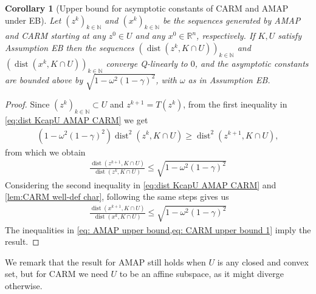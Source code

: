 \documentclass[smallextended,numbook,nospthms]{svjour3}
\theoremstyle{plain}
\newtheorem{corollary}[theorem]{Corollary}
\theoremstyle{definition}
\def\RR{\mathds R}
\def\NN{\mathds N}
\DeclareMathOperator{\dist}{dist}
\begin{document}
\begin{corollary}[Upper bound for asymptotic constants of CARM and AMAP under EB]\label{prop:EB Q conv}
	Let $\left(z^{k}\right)_{k \in \NN}$ and $\left(x^{k}\right)_{k \in \NN}$ be the sequences generated by AMAP and CARM starting at any $z^{0} \in U$ and any $x^{0} \in \RR^{n}$, respectively. If $K, U$ satisfy Assumption EB then the sequences $\left(\dist\left(z^{k}, K \cap U\right)\right)_{k \in \NN}$ and $\left(\dist\left(x^{k}, K \cap U\right)\right)_{k \in \NN}$ converge Q-linearly to $0$, and the asymptotic constants are bounded above by $\sqrt{1-\omega^{2}(1-\gamma)^{2}}$, with $\omega$ as in Assumption EB.
\end{corollary}
\begin{proof}
    Since $\left(z^{k}\right)_{k \in \NN} \subset U$ and $z^{k+1}=T\left(z^{k}\right)$, from the first inequality in \cref{eq:dist KcapU AMAP CARM} we get
	\begin{align}
		\left(1-\omega^{2}(1-\gamma)^{2}\right) \dist^{2}\left(z^{k}, K \cap U\right) \geq \dist^{2}\left(z^{k+1}, K \cap U\right),
	\end{align}
    from which we obtain
	\begin{align}\label{eq: AMAP upper bound}
		\frac{\dist\left(z^{k+1}, K \cap U\right)}{\dist\left(z^{k}, K \cap U\right)} \leq \sqrt{1-\omega^{2}(1-\gamma)^{2}}
	\end{align}
	Considering the second inequality in \cref{eq:dist KcapU AMAP CARM} and \cref{lem:CARM well-def char}, following the same steps gives us
	\begin{align}\label{eq: CARM upper bound 1}
		\frac{\dist\left(x^{k+1}, K \cap U\right)}{\dist\left(x^{k}, K \cap U\right)} \leq \sqrt{1-\omega^{2}(1-\gamma)^{2}}
	\end{align}
	The inequalities in \cref{eq: AMAP upper bound,eq: CARM upper bound 1} imply the result.
\end{proof}
We remark that the result for AMAP still holds when $U$ is any closed and convex set, but for  CARM we need $U$ to be an affine subspace, as it might diverge otherwise.
\end{document}

